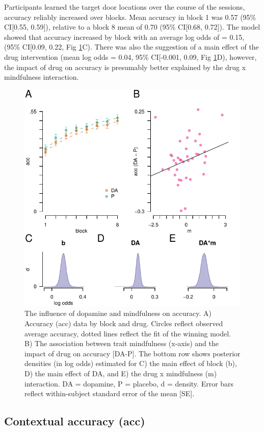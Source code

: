 \documentclass{article}
\begin{document}
Participants learned the target door locations over the course of the
sessions, accuracy reliably increased over blocks. Mean accuracy in
block 1 was 0.57 (95\% CI{[}0.55, 0.59{]}), relative to a block 8 mean
of 0.70 (95\% CI{[}0.68, 0.72{]}). The model showed that accuracy
increased by block with an average log odds of = 0.15, (95\% CI{[}0.09,
0.22, Fig \ref{fig:accfig}C). There was also the suggestion of a main
effect of the drug intervention (mean log odds = 0.04, 95\% CI{[}-0.001,
0.09, Fig \ref{fig:accfig}D), however, the impact of drug on accuracy is
presumably better explained by the drug x mindfulness interaction.

\begin{figure}

{\centering \includegraphics[width=0.7\linewidth]{../../images/acc_fig} 

}

\caption{The influence of dopamine and mindfulness on accuracy. A) Accuracy (acc) data by block and drug. Circles reflect observed average accuracy, dotted lines reflect the fit of the winning model. B) The association between trait mindfulness (x-axis) and the impact of drug on accuracy [DA-P]. The bottom row shows posterior densities (in log odds) estimated for C) the main effect of block (b), D) the main effect of DA, and E) the drug x mindfulness (m) interaction. DA = dopamine, P = placebo, d = density. Error bars reflect within-subject standard error of the mean [SE].}\label{fig:accfig}
\end{figure}

\hypertarget{contextual-accuracy-acc}{%
\subsection{Contextual accuracy (acc)}\label{contextual-accuracy-acc}}
\end{document}
